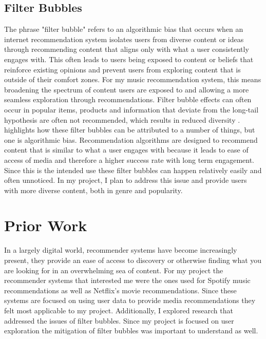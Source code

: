 \documentclass[10pt,twocolumn]{article}
\begin{document}
\subsection{Filter Bubbles}
The phrase "filter bubble" refers to an algorithmic bias that occurs when an internet recommendation system isolates users from diverse content or ideas through recommending content that aligns only with what a user consistently engages with.  This often leads to users being exposed to content or beliefs that reinforce existing opinions and prevent users from exploring content that is outside of their comfort zones. For my music recommendation system, this means broadening the spectrum of content users are exposed to and allowing a more seamless exploration through recommendations. Filter bubble effects can often occur in popular items, products and information that deviate from the long-tail hypothesis are often not recommended, which results in reduced diversity \cite{MohammadFB}. \textcite{MohammadFB} highlights how these filter bubbles can be attributed to a number of things, but one is algorithmic bias. Recommendation algorithms are designed to recommend content that is similar to what a user engages with because it leads to ease of access of media and therefore a higher success rate with long term engagement. Since this is the intended use these filter bubbles can happen relatively easily and often unnoticed. In my project, I plan to address this issue and provide users with more diverse content, both in genre and popularity. 


\section{Prior Work}
In a largely digital world, recommender systems have become increasingly present, they provide an ease of access to discovery or otherwise finding what you are looking for in an overwhelming sea of content. For my project the recommender systems that interested me were the ones used for Spotify music recommendations as well as Netflix's movie recommendations. Since these systems are focused on using user data to provide media recommendations they felt most applicable to my project. Additionally, I explored research that addressed the issues of filter bubbles. Since my project is focused on user exploration the mitigation of filter bubbles was important to understand as well. 
\end{document}
